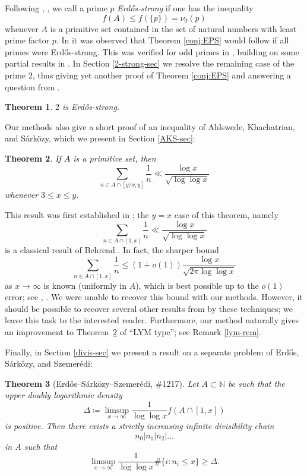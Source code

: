 \documentclass[12pt]{amsart}
\newtheorem{theorem}{Theorem}[section]
\theoremstyle{definition}
\theoremstyle{remark}
\numberwithin{equation}{section}
\newcommand{\N}{{\mathbb N}}
\newcommand{\1}{{\mathbf 1}}
\newcommand{\Erdos}{{Erd\H{o}s}}
\begin{document}
Following \cite{LP}, \cite{Lichtman}, we call a prime $p$ \emph{\Erdos{}-strong} if one has the inequality
$$f(A) \leq f(\{p\}) = \nu_0(p)$$ whenever $A$ is a primitive set contained in the set of natural numbers with least prime factor $p$.  In \cite{LP} it was observed that Theorem \ref{conj:EPS} would follow if all primes were \Erdos{}-strong.  This was verified for odd primes in \cite{Lichtman}, building on some partial results in \cite{LP}.  In Section \ref{2-strong-sec} we resolve the remaining case of the prime $2$, thus giving yet another proof of Theorem \ref{conj:EPS} and answering a question from \cite{Lichtman}.

\begin{theorem}\label{2-strong} $2$ is \Erdos{}-strong.
\end{theorem}

Our methods also give a short proof of an inequality of Ahlswede, Khachatrian, and S\'ark\"ozy, which we present in Section \ref{AKS-sec}:

\begin{theorem}\label{AKS-thm}  If $A$ is a primitive set, then
$$ \sum_{n \in A \cap [y/x,y]} \frac{1}{n} \ll \frac{\log x}{\sqrt{\log\log x}}$$
whenever $3 \leq x \leq y$.
\end{theorem}

This result was first established in \cite[Theorem 3]{AKS}; the $y=x$ case of this theorem, namely
\begin{equation}\label{ax}
\sum_{n \in A \cap [1,x]} \frac{1}{n} \ll \frac{\log x}{\sqrt{\log\log x}}
\end{equation}
is a classical result of Behrend \cite{behrend}.  In fact, the sharper bound
$$ \sum_{n \in A \cap [1,x]} \frac{1}{n} \leq (1 + o(1)) \frac{\log x}{\sqrt{2\pi \log\log x}}$$
as $x \to \infty$ is known (uniformly in $A$), which is best possible up to the $o(1)$ error; see \cite{ess1}, \cite{ess2}.  We were unable to recover this bound with our methods.  However, it should be possible to recover several other results from \cite{AKS} by these techniques; we leave this task to the interested reader.  Furthermore, our method naturally gives an improvement to Theorem~\ref{AKS-thm} of ``LYM type''; see Remark \ref{lym-rem}.

Finally, in Section \ref{divis-sec} we present a result on a separate problem of \Erdos{}, S\'ark\"ozy, and Szemer\'edi:

\begin{theorem}[\Erdos{}--S\'ark\"ozy--Szemer\'edi, \#1217] \label{conj:1217}
Let $A \subset \N$ be such that the upper doubly logarithmic density
$$ \Delta \coloneq \limsup_{x\to\infty}\frac{1}{\log\log x} f(A \cap [1,x])$$
is positive.  Then there exists a strictly increasing infinite divisibility chain
$$ n_0 | n_1 | n_2 | \dots$$
in $A$ such that
$$ \limsup_{x\to\infty}\frac{1}{\log\log x} \# \{ i: n_i \leq x \} \geq \Delta.$$
\end{theorem}
\end{document}
